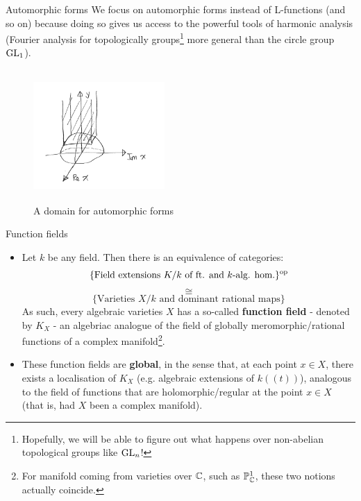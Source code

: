 \documentclass[professionalfonts]{beamer}
\begin{document}
    \begin{frame}{Automorphic forms}
         We focus on automorphic forms instead of L-functions (and so on) because doing so gives us access to the powerful tools of harmonic analysis (Fourier analysis for topologically groups\footnote{Hopefully, we will be able to figure out what happens over non-abelian topological groups like $\operatorname{GL}_n$!} more general than the circle group $\operatorname{GL}_1$). 
         
         \begin{figure}[H]
            \centering
            \includegraphics[width=5cm,height=5cm,keepaspectratio]{Proposal, timeline, and presentation/automorphic_forms.png}
            \caption{A domain for automorphic forms}
            \label{fig: automorphic_forms}
        \end{figure}
    \end{frame}
    
    \begin{frame}{Function fields}
        \begin{itemize}
            \item Let $k$ be any field. Then there is an equivalence of categories:
                $$\{\text{Field extensions $K/k$ of ft. and $k$-alg. hom.}\}^{\mathrm{op}}$$
                $$\cong$$
                $$\{\text{Varieties $X/k$ and dominant rational maps}\}$$
            As such, every algebraic varieties $X$ has a so-called \textbf{function field} - denoted by $K_X$ - an algebriac analogue of the field of globally meromorphic/rational functions of a complex manifold\footnote{For manifold coming from varieties over $\mathbb{C}$, such as $\mathbb{P}^1_{\mathbb{C}}$, these two notions actually coincide.}.
            \item These function fields are \textbf{global}, in the sense that, at each point $x \in X$, there exists a localisation of $K_X$ (e.g. algebraic extensions of $k(\!(t)\!)$), analogous to the field of functions that are holomorphic/regular at the point $x \in X$ (that is, had $X$ been a complex manifold). 
        \end{itemize}
    \end{frame}
    
\end{document}
